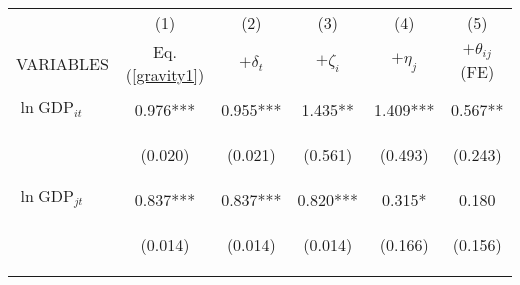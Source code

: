\begin{center}
\begin{tabular}{lccccc} \hline
 & (1) & (2) & (3) & (4) & (5) \\
VARIABLES & Eq. (\ref{gravity1}) & $+\delta_t$ & $+\zeta_i$ & $+\eta_j$ & $+\theta_{ij}$ (FE) \\ \hline
\vspace{4pt} & \begin{footnotesize}\end{footnotesize} & \begin{footnotesize}\end{footnotesize} & \begin{footnotesize}\end{footnotesize} & \begin{footnotesize}\end{footnotesize} & \begin{footnotesize}\end{footnotesize} \\
$\ln\text{GDP}_{it}$ & 0.976*** & 0.955*** & 1.435** & 1.409*** & 0.567** \\
\vspace{4pt} & \begin{footnotesize}(0.020)\end{footnotesize} & \begin{footnotesize}(0.021)\end{footnotesize} & \begin{footnotesize}(0.561)\end{footnotesize} & \begin{footnotesize}(0.493)\end{footnotesize} & \begin{footnotesize}(0.243)\end{footnotesize} \\
$\ln\text{GDP}_{jt}$ & 0.837*** & 0.837*** & 0.820*** & 0.315* & 0.180 \\
\vspace{4pt} & \begin{footnotesize}(0.014)\end{footnotesize} & \begin{footnotesize}(0.014)\end{footnotesize} & \begin{footnotesize}(0.014)\end{footnotesize} & \begin{footnotesize}(0.166)\end{footnotesize} & \begin{footnotesize}(0.156)\end{footnotesize} \\

\end{tabular}
\end{center}
